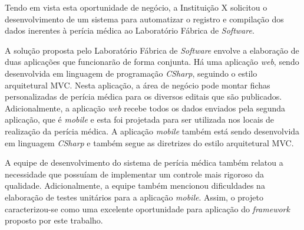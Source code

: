 Tendo em vista esta oportunidade de negócio, a Instituição X solicitou o desenvolvimento de um sistema para automatizar o registro e compilação dos dados inerentes à perícia médica ao Laboratório Fábrica de \textit{Software}.

A solução proposta pelo Laboratório Fábrica de \textit{Software} envolve a elaboração de duas aplicações que funcionarão de forma conjunta. Há uma aplicação \textit{web}, sendo desenvolvida em linguagem de programação \textit{CSharp}, seguindo o estilo arquitetural MVC. Nesta aplicação, a área de negócio pode montar fichas personalizadas de perícia médica para os diversos editais que são publicados. Adicionalmente, a aplicação \textit{web} recebe todos os dados enviados pela segunda aplicação, que é \textit{mobile} e esta foi projetada para ser utilizada nos locais de realização da perícia médica. A aplicação \textit{mobile} também está sendo desenvolvida em linguagem \textit{CSharp} e também segue as diretrizes do estilo arquitetural MVC.

A equipe de desenvolvimento do sistema de perícia médica também relatou a necessidade que possuíam de implementar um controle mais rigoroso da qualidade. Adicionalmente, a equipe também mencionou dificuldades na elaboração de testes unitários para a aplicação \textit{mobile}. Assim, o projeto caracterizou-se como uma excelente oportunidade para aplicação do \textit{framework} proposto por este trabalho.